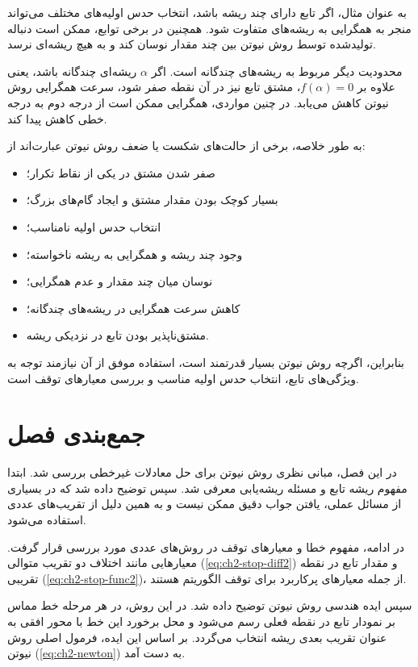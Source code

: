 به عنوان مثال، اگر تابع دارای چند ریشه باشد، انتخاب حدس اولیه‌های مختلف می‌تواند منجر به همگرایی به ریشه‌های متفاوت شود. همچنین در برخی توابع، ممکن است دنباله تولیدشده توسط روش نیوتن بین چند مقدار نوسان کند و به هیچ ریشه‌ای نرسد.

محدودیت دیگر مربوط به ریشه‌های چندگانه است. اگر $\alpha$ ریشه‌ای چندگانه باشد، یعنی علاوه بر $f(\alpha)=0$، مشتق تابع نیز در آن نقطه صفر شود، سرعت همگرایی روش نیوتن کاهش می‌یابد. در چنین مواردی، همگرایی ممکن است از درجه دوم به درجه خطی کاهش پیدا کند.

به طور خلاصه، برخی از حالت‌های شکست یا ضعف روش نیوتن عبارت‌اند از:
\begin{itemize}
    \item صفر شدن مشتق در یکی از نقاط تکرار؛
    \item بسیار کوچک بودن مقدار مشتق و ایجاد گام‌های بزرگ؛
    \item انتخاب حدس اولیه نامناسب؛
    \item وجود چند ریشه و همگرایی به ریشه ناخواسته؛
    \item نوسان میان چند مقدار و عدم همگرایی؛
    \item کاهش سرعت همگرایی در ریشه‌های چندگانه؛
    \item مشتق‌ناپذیر بودن تابع در نزدیکی ریشه.
\end{itemize}

بنابراین، اگرچه روش نیوتن بسیار قدرتمند است، استفاده موفق از آن نیازمند توجه به ویژگی‌های تابع، انتخاب حدس اولیه مناسب و بررسی معیارهای توقف است.

\section{جمع‌بندی فصل}

در این فصل، مبانی نظری روش نیوتن برای حل معادلات غیرخطی بررسی شد. ابتدا مفهوم ریشه تابع و مسئله ریشه‌یابی معرفی شد. سپس توضیح داده شد که در بسیاری از مسائل عملی، یافتن جواب دقیق ممکن نیست و به همین دلیل از تقریب‌های عددی استفاده می‌شود.

در ادامه، مفهوم خطا و معیارهای توقف در روش‌های عددی مورد بررسی قرار گرفت. معیارهایی مانند اختلاف دو تقریب متوالی (\eqref{eq:ch2-stop-diff2}) و مقدار تابع در نقطه تقریبی (\eqref{eq:ch2-stop-func2})، از جمله معیارهای پرکاربرد برای توقف الگوریتم هستند.

سپس ایده هندسی روش نیوتن توضیح داده شد. در این روش، در هر مرحله خط مماس بر نمودار تابع در نقطه فعلی رسم می‌شود و محل برخورد این خط با محور افقی به عنوان تقریب بعدی ریشه انتخاب می‌گردد. بر اساس این ایده، فرمول اصلی روش نیوتن (\eqref{eq:ch2-newton}) به دست آمد.

